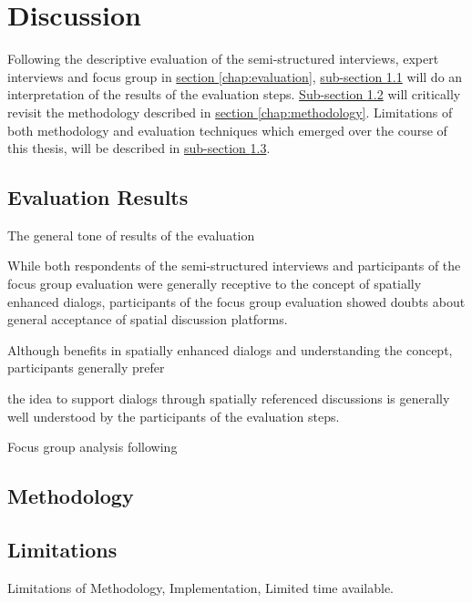 \section{Discussion}
\label{chap:discussion}
Following the descriptive evaluation of the semi-structured interviews, expert interviews and focus group in \hyperref[chap:evaluation]{section \ref{chap:evaluation}}, \hyperref[sub:evaluation-results]{sub-section \ref{sub:evaluation-results}} will do an interpretation of the results of the evaluation steps. \hyperref[sub:method-discussion]{Sub-section \ref{sub:method-discussion}} will critically revisit the methodology described in \hyperref[chap:methodology]{section \ref{chap:methodology}}. Limitations of both methodology and evaluation techniques which emerged over the course of this thesis, will be described in \hyperref[sub:limitations]{sub-section \ref{sub:limitations}}.

\subsection{Evaluation Results}
\label{sub:evaluation-results}
The general tone of results of the evaluation 


While both respondents of the semi-structured interviews and participants of the focus group evaluation were generally receptive to the concept of spatially enhanced dialogs, participants of the focus group evaluation showed doubts about general acceptance of spatial discussion platforms.

Although  benefits in spatially enhanced dialogs and understanding the concept, participants generally prefer 

the idea to support dialogs through spatially referenced discussions is generally well understood by the participants of the evaluation steps.


Focus group analysis following \cite{asbury1995overview}

\subsection{Methodology}
\label{sub:method-discussion}

\subsection{Limitations}
\label{sub:limitations}

Limitations of Methodology, Implementation, Limited time available.


